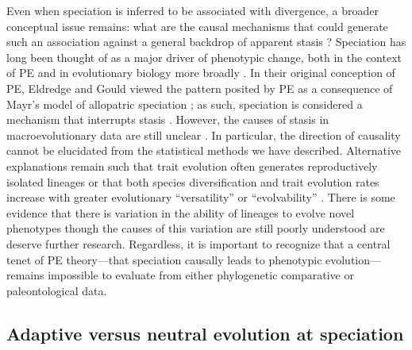 Even when speciation is inferred to be associated with divergence, a broader conceptual issue remains: what are the causal mechanisms that could generate such an association against a general backdrop of apparent stasis \citep{BentonPearson2001, Eldredge2005}? Speciation has long been thought of as a major driver of phenotypic change, both in the context of PE and in evolutionary biology more broadly \citep{Saetre2013}. In their original conception of PE, Eldredge and Gould \citep{Eldredge1971, EldredgeGould1972} viewed the pattern posited by PE as a consequence of Mayr's model of allopatric speciation \citep{Mayr}; as such, speciation is considered a mechanism that interrupts stasis \citep{Futuyma1987, Futuyma2010}. However, the causes of stasis in macroevolutionary data are still unclear \citep{Futuyma2010, HansenHoule2004, EstesArnold2007, WalshBlows2009}. In particular, the direction of causality cannot be elucidated from the statistical methods we have described. Alternative explanations remain such that trait evolution often generates reproductively isolated lineages or that both species diversification and trait evolution rates increase with greater evolutionary ``versatility'' or ``evolvability'' \citep{Vermeij1973, Adamowicz2008, Rabosky2013}. There is some evidence that there is variation in the ability of lineages to evolve novel phenotypes \citep{Liem1975, Martin2011} though the causes of this variation are still poorly understood are deserve further research.  Regardless, it is important to recognize that a central tenet of PE theory---that speciation causally leads to phenotypic evolution---remains impossible to evaluate from either phylogenetic comparative or paleontological data. 

\subsection{Adaptive versus neutral evolution at speciation}

